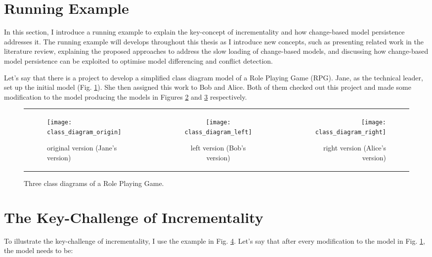 \section{Running Example}
\label{sec:running_example_1}
In this section, I introduce a running example to explain the key-concept of incrementality and how change-based model persistence addresses it. The running example will develops throughout this thesis as I introduce new concepts, such as presenting related work in the literature review, explaining the proposed approaches to address the slow loading of change-based models, and discussing how change-based model persistence can be exploited to optimise model differencing and conflict detection.

Let's say that there is a project to develop a simplified class diagram model of a Role Playing Game (RPG). Jane, as the technical leader, set up the initial model (Fig. \ref{fig:class_diagram_origin}). She then assigned this work to Bob and Alice. Both of them checked out this project and made some modification to the model producing the models in Figures \ref{fig:class_diagram_left} and \ref{fig:class_diagram_right} respectively.

\begin{figure}[ht]
    \begin{tabular}{l|c|r}
        \begin{subfigure}[t]{0.31\linewidth}
            \texttt{[image: class\_diagram\_origin]}
            \caption{original version (Jane's version)}
            \label{fig:class_diagram_origin}
        \end{subfigure}
        &
        \begin{subfigure}[t]{0.31\linewidth}
            \texttt{[image: class\_diagram\_left]}
            \caption{left version (Bob's version)}
            \label{fig:class_diagram_left}
        \end{subfigure}
        &
        \begin{subfigure}[t]{0.31\linewidth}
            \texttt{[image: class\_diagram\_right]}
            \caption{right version (Alice's version)}
            \label{fig:class_diagram_right}
        \end{subfigure}
    \end{tabular}
    \caption{Three class diagrams of a Role Playing Game.}
    \label{fig:class_diagram_rpg}
\end{figure}

\section{The Key-Challenge of Incrementality}
\label{sec:the_key_challenge_of_ _incrementality}
To illustrate the key-challenge of incrementality, I use the example in Fig. \ref{fig:class_diagram_rpg}. Let's say that after every modification to the model in Fig. \ref{fig:class_diagram_origin}, the model needs to be:

